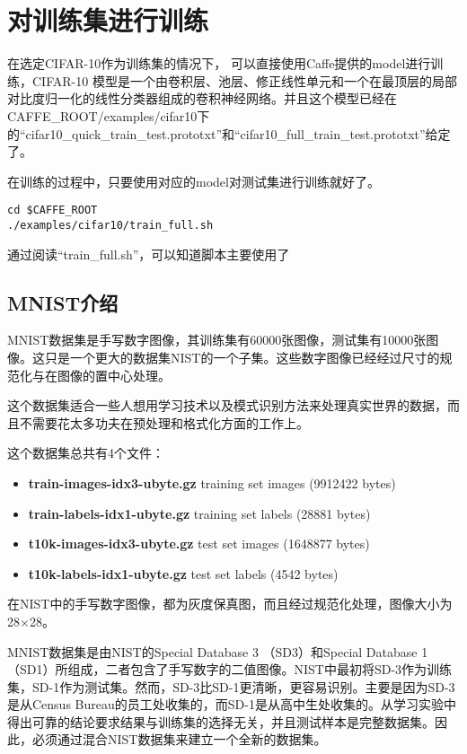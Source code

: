 \section{对训练集进行训练}

在选定CIFAR-10作为训练集的情况下， 可以直接使用Caffe提供的model进行训练，CIFAR-10 模型是一个由卷积层、池层、修正线性单元和一个在最顶层的局部对比度归一化的线性分类器组成的卷积神经网络。并且这个模型已经在 CAFFE\_ROOT/examples/cifar10下的“cifar10\_quick\_train\_test.prototxt”和“cifar10\_full\_train\_test.prototxt”给定了。

在训练的过程中，只要使用对应的model对测试集进行训练就好了。

\begin{lstlisting}
cd $CAFFE_ROOT
./examples/cifar10/train_full.sh
\end{lstlisting}

通过阅读“train\_full.sh”，可以知道脚本主要使用了 



\subsection{MNIST介绍}
MNIST数据集是手写数字图像，其训练集有60000张图像，测试集有10000张图像。这只是一个更大的数据集NIST的一个子集。这些数字图像已经经过尺寸的规范化与在图像的置中心处理。

这个数据集适合一些人想用学习技术以及模式识别方法来处理真实世界的数据，而且不需要花太多功夫在预处理和格式化方面的工作上。

这个数据集总共有4个文件：
\begin{itemize}
\item \textbf{{\footnotesize{train-images-idx3-ubyte.gz}}} {\footnotesize{training set images (9912422 bytes)}} 
\item \textbf{{\footnotesize{train-labels-idx1-ubyte.gz}}} {\footnotesize{training set labels (28881 bytes)}} 
\item \textbf{{\footnotesize{t10k-images-idx3-ubyte.gz}}} {\footnotesize{test set images (1648877 bytes)}} 
\item \textbf{{\footnotesize{t10k-labels-idx1-ubyte.gz}}} {\footnotesize{test set labels (4542 bytes)}}
\end{itemize}

在NIST中的手写数字图像，都为灰度保真图，而且经过规范化处理，图像大小为28$\times$28。

MNIST数据集是由NIST的Special Database 3 （SD3）和Special Database 1（SD1）所组成，二者包含了手写数字的二值图像。NIST中最初将SD-3作为训练集，SD-1作为测试集。然而，SD-3比SD-1更清晰，更容易识别。主要是因为SD-3是从Census Bureau的员工处收集的，而SD-1是从高中生处收集的。从学习实验中得出可靠的结论要求结果与训练集的选择无关，并且测试样本是完整数据集。因此，必须通过混合NIST数据集来建立一个全新的数据集。

